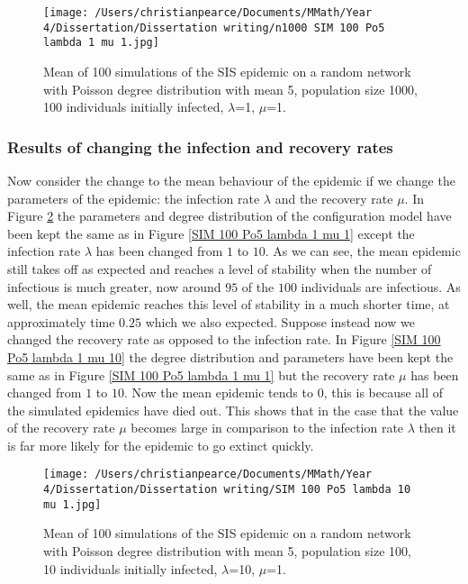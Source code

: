 \documentclass{uonmathsreport}
\begin{document}
\begin{figure}
\begin{center}
\texttt{[image: /Users/christianpearce/Documents/MMath/Year 4/Dissertation/Dissertation writing/n1000 SIM 100 Po5 lambda 1 mu 1.jpg]}
\end{center}
\caption{Mean of 100 simulations of the SIS epidemic on a random network with Poisson degree distribution with mean 5, population size 1000, 100 individuals initially infected, $\lambda$=1, $\mu$=1.}
\label{n1000 SIM 100 Po5 lambda 1 mu 1}
\end{figure}

\subsubsection{Results of changing the infection and recovery rates} \label{subsub:5.5.2}

Now consider the change to the mean behaviour of the epidemic if we change the parameters of the epidemic: the infection rate $\lambda$ and the recovery rate $\mu$. In Figure \ref{SIM 100 Po5 lambda 10 mu 1} the parameters and degree distribution of the configuration model have been kept the same as in Figure \ref{SIM 100 Po5 lambda 1 mu 1} except the infection rate $\lambda$ has been changed from $1$ to $10$. As we can see, the mean epidemic still takes off as expected and reaches a level of stability when the number of infectious is much greater, now around $95$ of the $100$ individuals are infectious. As well, the mean epidemic reaches this level of stability in a much shorter time, at approximately time $0.25$ which we also expected. Suppose instead now we changed the recovery rate as opposed to the infection rate. In Figure \ref{SIM 100 Po5 lambda 1 mu 10} the degree distribution and parameters have been kept the same as in Figure \ref{SIM 100 Po5 lambda 1 mu 1} but the recovery rate $\mu$ has been changed from $1$ to $10$. Now the mean epidemic tends to $0$, this is because all of the simulated epidemics have died out. This shows that in the case that the value of the recovery rate $\mu$ becomes large in comparison to the infection rate $\lambda$ then it is far more likely for the epidemic to go extinct quickly.

\begin{figure}
\begin{center}
\texttt{[image: /Users/christianpearce/Documents/MMath/Year 4/Dissertation/Dissertation writing/SIM 100 Po5 lambda 10 mu 1.jpg]}
\end{center}
\caption{Mean of 100 simulations of the SIS epidemic on a random network with Poisson degree distribution with mean 5, population size 100, 10 individuals initially infected, $\lambda$=10, $\mu$=1.}
\label{SIM 100 Po5 lambda 10 mu 1}
\end{figure}
\end{document}
